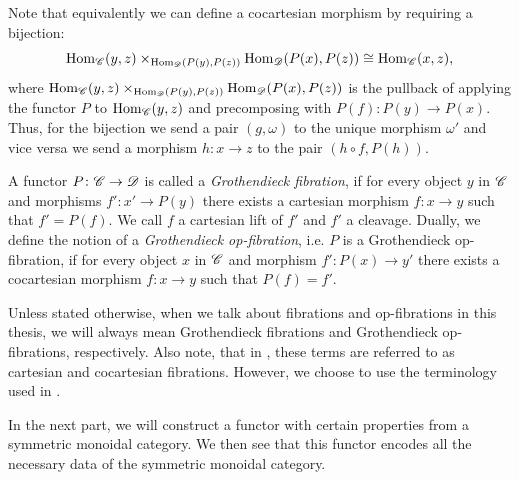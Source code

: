     Note that equivalently we can define a cocartesian morphism by requiring a
    bijection:
    \[
    \operatorname{Hom}_{\mathscr{C}}(y,z) \times_{\operatorname{Hom}_{\mathscr{D}}(P(y), P(z))} \operatorname{Hom}_{\mathscr{D}}(P(x), P(z)) \cong \operatorname{Hom}_{\mathscr{C}}(x,z),
    \]
    where $\operatorname{Hom}_{\mathscr{C}}(y,z) \times_{\operatorname{Hom}_{\mathscr{D}}(P(y), P(z))} \operatorname{Hom}_{\mathscr{D}}(P(x), P(z))$
    is the pullback of applying the functor $P$ to $\operatorname{Hom}_{\mathscr{C}}(y,z)$ and
    precomposing with $P(f) \colon P(y) \to P(x)$. Thus, for the bijection we
    send a pair $(g, \omega)$ to the unique morphism $\omega'$ and vice versa we
    send a morphism $h \colon x \to z$ to the pair $(h \circ f, P(h))$.

    \begin{defin}
        A functor $P \colon \mathscr{C} \to \mathscr{D}$ is called a {\em Grothendieck fibration},
        if for every object $y$ in $\mathscr{C}$ and morphisms $f' \colon x' \to P(y)$
        there exists a cartesian morphism $f \colon x \to y$ such that $f' =
        P(f)$. We call $f$ a cartesian lift of $f'$ and $f'$ a cleavage. Dually,
        we define the notion of a {\em Grothendieck op-fibration}, i.e. $P$ is a
        Grothendieck op-fibration, if for every object $x$ in $\mathscr{C}$ and morphism
        $f' \colon P(x) \to y'$ there exists a cocartesian morphism $f \colon x
        \to y$ such that $P(f)=f'$.
    \end{defin}

    Unless stated otherwise, when we talk about fibrations and op-fibrations in
    this thesis, we will always mean Grothendieck fibrations and Grothendieck
    op-fibrations, respectively. Also note, that in
    \cite[\href{https://kerodon.net/tag/01RF}{Definition 01RF}]{kerodon}, these
    terms are referred to as cartesian and cocartesian fibrations. However, we
    choose to use the terminology used in \cite{ha}.
    
    In the next part, we will construct a functor with certain properties from
    a symmetric monoidal category. We then see that this functor encodes all
    the necessary data of the symmetric monoidal category.

